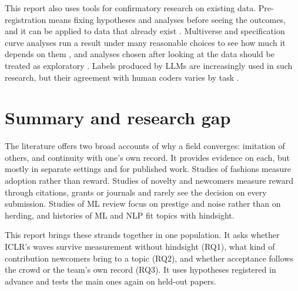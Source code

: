 This report also uses tools for confirmatory research on existing data. Pre-registration means fixing hypotheses and
analyses before seeing the outcomes, and it can be applied to data that already exist
\citep{nosek2018preregistration,vandenakker2021preregistration}. Multiverse and specification curve analyses run a
result under many reasonable choices to see how much it depends on them
\citep{steegen2016increasing,simonsohn2020specification}, and analyses chosen after looking at the data should be
treated as exploratory \citep{gelman2014statistical}. Labels produced by LLMs are increasingly used in such research,
but their agreement with human coders varies by task \citep{ziems2024can}.

\section{Summary and research gap}
\label{sec:lit-gap}

The literature offers two broad accounts of why a field converges: imitation of others, and continuity with one's own
record. It provides evidence on each, but mostly in separate settings and for published work. Studies of fashions
measure adoption rather than reward. Studies of novelty and newcomers measure reward through citations, grants or
journals and rarely see the decision on every submission. Studies of ML review focus on prestige and noise rather than
on herding, and histories of ML and NLP fit topics with hindsight.

This report brings these strands together in one population. It asks whether ICLR's waves survive measurement without
hindsight (RQ1), what kind of contribution newcomers bring to a topic (RQ2), and whether acceptance follows the crowd or
the team's own record (RQ3). It uses hypotheses registered in advance and tests the main ones again on held-out papers.
